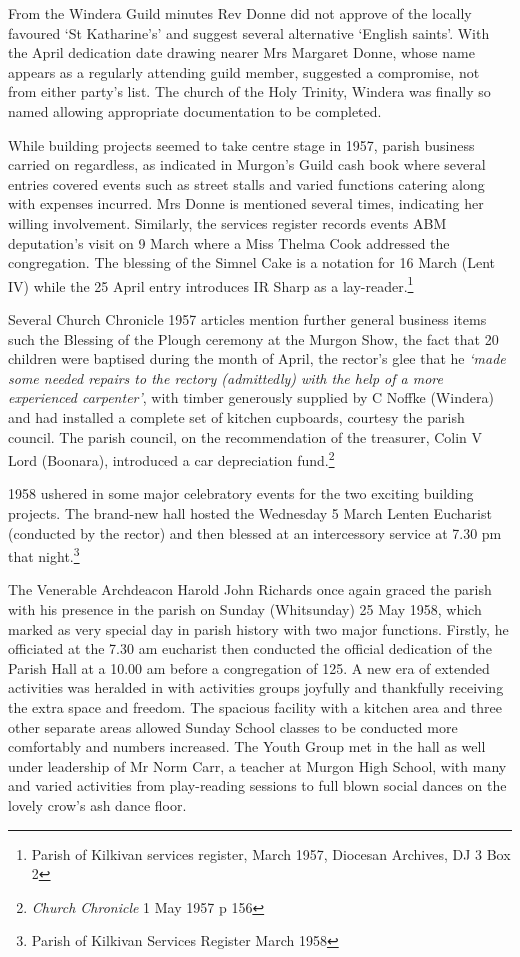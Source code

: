 From the Windera Guild minutes Rev Donne did not approve of the locally favoured `St Katharine's' and suggest several alternative `English saints'. With the April dedication date drawing nearer Mrs Margaret Donne, whose name appears as a regularly attending guild member, suggested a compromise, not from either party's list. The church of the Holy Trinity, Windera was finally so named allowing appropriate documentation to be completed.



While building projects seemed to take centre stage in 1957, parish business carried on regardless, as indicated in Murgon's Guild cash book where several entries covered events such as street stalls and varied functions catering along with expenses incurred. Mrs Donne is mentioned several times, indicating her willing involvement. Similarly, the services register records events ABM deputation's visit on 9 March where a Miss Thelma Cook addressed the congregation. The blessing of the Simnel Cake is a notation for 16 March (Lent IV) while the 25 April entry introduces IR Sharp as a lay-reader.\footnote{Parish of Kilkivan services register, March 1957, Diocesan Archives, DJ 3 Box 2}


Several Church Chronicle 1957 articles mention further general business items such the Blessing of the Plough ceremony at the Murgon Show, the fact that 20 children were baptised during the month of April, the rector's glee that he \emph{`made some needed repairs to the rectory (admittedly) with the help of a more experienced carpenter'}, with timber generously supplied by C Noffke (Windera) and had installed a complete set of kitchen cupboards, courtesy the parish council. The parish council, on the recommendation of the treasurer, Colin V Lord (Boonara), introduced a car depreciation fund.\footnote{\emph{Church Chronicle} 1 May 1957 p 156}


1958 ushered in some major celebratory events for the two exciting building projects. The brand-new hall hosted the Wednesday 5 March Lenten Eucharist (conducted by the rector) and then blessed at an intercessory service at 7.30 pm that night.\footnote{Parish of Kilkivan Services Register March 1958}


The Venerable Archdeacon Harold John Richards once again graced the parish with his presence in the parish on Sunday (Whitsunday) 25 May 1958, which marked as very special day in parish history with two major functions. Firstly, he officiated at the 7.30 am eucharist then conducted the official dedication of the Parish Hall at a 10.00 am before a congregation of 125. A new era of extended activities was heralded in with activities groups joyfully and thankfully receiving the extra space and freedom. The spacious facility with a kitchen area and three other separate areas allowed Sunday School classes to be conducted more comfortably and numbers increased. The Youth Group met in the hall as well under leadership of Mr Norm Carr, a teacher at Murgon High School, with many and varied activities from play-reading sessions to full blown social dances on the lovely crow's ash dance floor.



